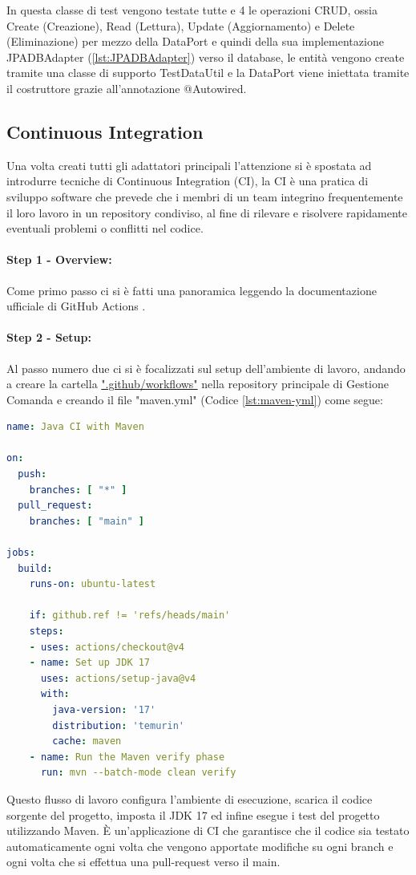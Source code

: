 In questa classe di test vengono testate tutte e 4 le operazioni CRUD, ossia Create (Creazione), Read (Lettura), Update (Aggiornamento) e Delete (Eliminazione) per mezzo della DataPort e quindi della sua implementazione JPADBAdapter (\vref{lst:JPADBAdapter}) verso il database, le entità vengono create tramite una classe di supporto TestDataUtil e la DataPort viene iniettata tramite il costruttore grazie all'annotazione @Autowired.


\subsection{Continuous Integration}
Una volta creati tutti gli adattatori principali l'attenzione si è spostata ad introdurre tecniche di Continuous Integration (CI), la CI è una pratica di sviluppo software che prevede che i membri di un team integrino frequentemente il loro lavoro in un repository condiviso, al fine di rilevare e risolvere rapidamente eventuali problemi o conflitti nel codice.
\paragraph{Step 1 - Overview:}
Come primo passo ci si è fatti una panoramica leggendo la documentazione ufficiale di GitHub Actions \cite{ContinuousIntegrationGithubActions}.
\paragraph{Step 2 - Setup:}
Al passo numero due ci si è focalizzati sul setup dell’ambiente di lavoro, andando a creare la cartella \href{https://github.com/giorgio-hash/GestioneComanda/tree/main/.github/workflows}{".github/workflows"} nella repository principale di Gestione Comanda e creando il file "maven.yml" (Codice \vref{lst:maven-yml}) come segue:
\begin{lstlisting}[language=yaml, caption={Creazione del file maven.yml}, label=lst:maven-yml]
name: Java CI with Maven

on:
  push:
    branches: [ "*" ]
  pull_request:
    branches: [ "main" ]

jobs:
  build:
    runs-on: ubuntu-latest
    
    if: github.ref != 'refs/heads/main'
    steps:
    - uses: actions/checkout@v4
    - name: Set up JDK 17
      uses: actions/setup-java@v4
      with:
        java-version: '17'
        distribution: 'temurin'
        cache: maven
    - name: Run the Maven verify phase
      run: mvn --batch-mode clean verify
\end{lstlisting}
Questo flusso di lavoro configura l'ambiente di esecuzione, scarica il codice sorgente del progetto, imposta il JDK 17 ed infine esegue i test del progetto utilizzando Maven. È un'applicazione di CI che garantisce che il codice sia testato automaticamente ogni volta che vengono apportate modifiche su ogni branch e ogni volta che si effettua una pull-request verso il main.
